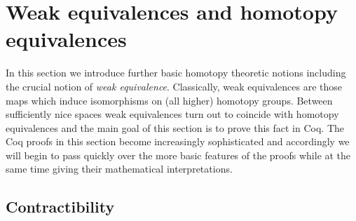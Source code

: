 \section{Weak equivalences and homotopy equivalences} \label{sec:bh}

In this section we introduce further basic homotopy theoretic notions
including the crucial notion of \emph{weak equivalence}.  Classically,
weak equivalences are those maps which induce isomorphisms on (all
higher) homotopy groups.  Between sufficiently nice spaces weak
equivalences turn out to coincide with homotopy equivalences and the
main goal of this section is to prove this fact in Coq.  The Coq
proofs in this section become increasingly sophisticated and
accordingly we will begin to pass quickly over the more basic features
of the proofs while at the same time giving their mathematical
interpretations.

\subsection{Contractibility}\label{sec:contr}


